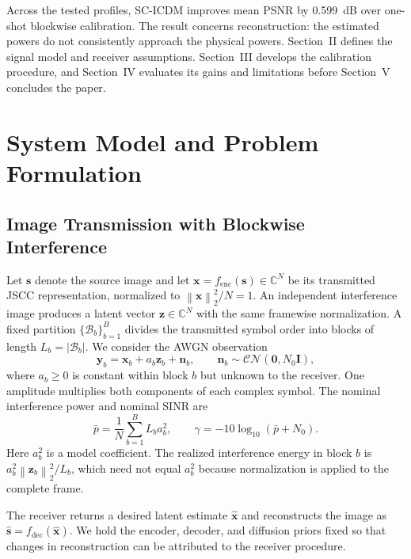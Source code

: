 \documentclass[conference]{IEEEtran}
\newcommand{\method}{SC-ICDM}
\newcommand{\vect}[1]{\boldsymbol{#1}}
\newcommand{\norm}[1]{\left\lVert#1\right\rVert}
\begin{document}
Across the tested profiles, \method{} improves mean PSNR by 0.599~dB over
one-shot blockwise calibration. The result concerns reconstruction: the
estimated powers do not consistently approach the physical powers.
Section~II defines the signal model and receiver assumptions.
Section~III develops the calibration procedure, and Section~IV evaluates
its gains and limitations before Section~V concludes the paper.

\section{System Model and Problem Formulation}

\subsection{Image Transmission with Blockwise Interference}

Let $\vect{s}$ denote the source image and let
$\vect{x}=f_{\mathrm{enc}}(\vect{s})\in\mathbb{C}^{N}$ be its transmitted
JSCC representation, normalized to $\norm{\vect{x}}_2^2/N=1$.
An independent interference image produces a latent vector
$\vect{z}\in\mathbb{C}^{N}$ with the same framewise normalization.
A fixed partition $\{\mathcal{B}_b\}_{b=1}^{B}$ divides the transmitted
symbol order into blocks of length $L_b=|\mathcal{B}_b|$.
We consider the AWGN observation
\begin{equation}
    \vect{y}_b=\vect{x}_b+a_b\vect{z}_b+\vect{n}_b,\qquad
    \vect{n}_b\sim\mathcal{CN}(\vect{0},N_0\vect{I}),
    \label{eq:system}
\end{equation}
where $a_b\geq0$ is constant within block $b$ but unknown to the receiver.
One amplitude multiplies both components of each complex symbol.
The nominal interference power and nominal SINR are
\begin{equation}
    \bar p=\frac{1}{N}\sum_{b=1}^{B}L_ba_b^2,\qquad
    \gamma=-10\log_{10}(\bar p+N_0).
    \label{eq:nominal}
\end{equation}
Here $a_b^2$ is a model coefficient. The realized interference energy in
block $b$ is $a_b^2\norm{\vect{z}_b}_2^2/L_b$, which need not equal
$a_b^2$ because normalization is applied to the complete frame.

The receiver returns a desired latent estimate $\widehat{\vect{x}}$ and
reconstructs the image as
$\widehat{\vect{s}}=f_{\mathrm{dec}}(\widehat{\vect{x}})$.
We hold the encoder, decoder, and diffusion priors fixed so that changes
in reconstruction can be attributed to the receiver procedure.
\end{document}
